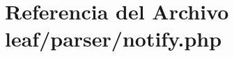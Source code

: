 \hypertarget{leaf_2parser_2notify_8php}{\section{Referencia del Archivo leaf/parser/notify.php}
\label{leaf_2parser_2notify_8php}
}
